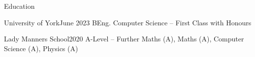 \documentclass{structure}
\begin{document}

\begin{rSection}{Education}

    \begin{rSubsectionNoList}{University of York}{June 2023}{
            BEng. Computer Science -- First Class with Honours
        }{}{}
    \end{rSubsectionNoList}

    \begin{rSubsectionNoList}{Lady Manners School}{2020}{
            A-Level --  Further Maths (A), Maths (A), Computer Science (A), Physics (A)
        }{}{}
    \end{rSubsectionNoList}

\end{rSection}


\end{document}
